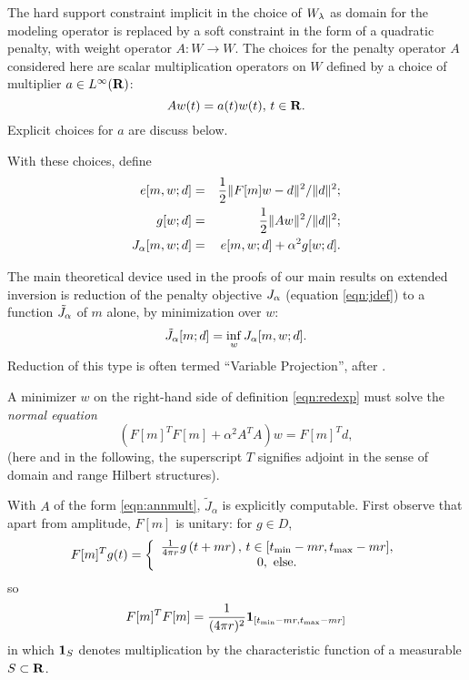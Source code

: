 The hard
support constraint implicit in the choice of $W_{\lambda}$ as domain for the
modeling operator is replaced by a soft constraint in the form of a
quadratic penalty, with weight operator $A:W \rightarrow W$.
The choices for the penalty operator $A$ considered here are scalar 
multiplication operators on $W$ defined by a choice of multiplier $a \in L^{\infty}({\bf R})$:
\begin{equation}
  \label{eqn:annmult}
  A w(t)= a(t)w(t), \, t\in {\bf R}.
\end{equation}
Explicit choices
for $a$ are discuss below.

With these choices, define
\begin{eqnarray}
  \label{eqn:edef}
  e[m,w;d] & = & \frac{1}{2}\|F[m]w-d\|^2/\|d\|^2;\\
  \label{eqn:gdef}
  g[w;d] & = & \frac{1}{2}\|Aw\|^2/\|d\|^2;\\
  \label{eqn:jdef}
  J_{\alpha}[m,w;d] & = & e[m,w;d] + \alpha^2g[w;d].
\end{eqnarray}

The main theoretical device used in the proofs of our main results on 
extended inversion is reduction of the penalty objective $J_{\alpha}$
(equation \ref{eqn:jdef}) to a function $\tilde{J}_{\alpha}$ of 
$m$ alone, by minimization over $w$:
\begin{equation}
  \label{eqn:redexp}
  \tilde{J}_{\alpha}[m;d] = \inf_w J_{\alpha}[m,w;d].
\end{equation}
Reduction of this type is often termed ``Variable Projection'', after \cite{GolubPereyra:73,GolubPereyra:03}.

A minimizer $w$ on the right-hand side of definition
\ref{eqn:redexp} must solve the {\em normal equation}
\begin{equation}
  \label{eqn:norm}
  (F[m]^TF[m]+\alpha^2A^TA)w= F[m]^Td, 
\end{equation}
(here and in the following, the superscript $T$ signifies adjoint in
the sense of domain and range Hilbert structures).

With $A$ of the form \ref{eqn:annmult}, $\tilde{J}_{\alpha}$ is explicitly
computable. First observe that apart from amplitude, $F[m]$ is
unitary: for $g \in D$,
\begin{equation}
\label{eqn:tran}
F[m]^T g (t) =
\left\{
  \begin{array}{c}
    \frac{1}{4\pi r}g\left(t+mr\right), \, t \in [t_{\rm min}-mr,
    t_{\rm max}-mr],\\
    0, \mbox{ else.}
  \end{array}
\right.
\end{equation}
so
\begin{equation}
  \label{eqn:unit}
  F[m]^TF[m] = \frac{1}{(4\pi r)^2}{\bf 1}_{[t_{\rm min}-mr,  
    t_{\rm max}-mr]}
\end{equation}
in which ${\bf 1}_{S}$ denotes
multiplication by the characteristic function of a measurable 
$S \subset {\bf R}$.


